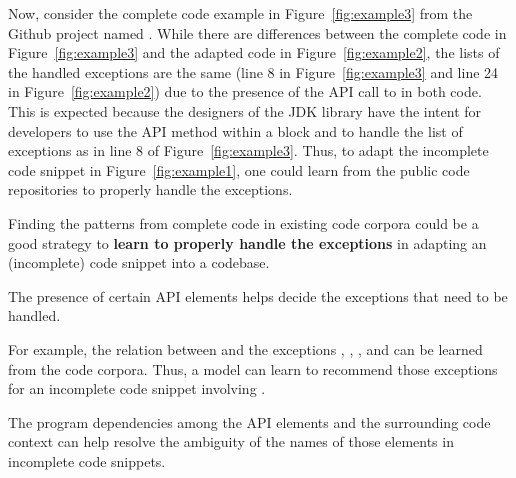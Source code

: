 




Now, consider the complete code example in Figure~\ref{fig:example3}
from the Github project named . While there are
differences between the complete code in Figure~\ref{fig:example3} and
the adapted code in Figure~\ref{fig:example2}, the lists of the handled
exceptions are the same (line 8 in Figure~\ref{fig:example3} and line
24 in Figure~\ref{fig:example2}) due to the presence of the API call
to  in both code. This is expected because
the designers of the JDK library have the intent for developers to use
the API method  within a 
block and to handle the list of exceptions as in line 8 of
Figure~\ref{fig:example3}. Thus, to adapt the incomplete code snippet
in Figure~\ref{fig:example1}, one could learn from the public code
repositories to properly handle the exceptions.

\begin{Observation} 
\label{ob2}
Finding the patterns from complete code in existing code corpora could
be a good strategy to {\bf learn to properly handle the exceptions} in
adapting an (incomplete) code snippet into a codebase.
\end{Observation}

\begin{Observation} 
\label{ob3}
The presence of certain API elements helps decide the exceptions that
need to be handled.
\end{Observation}


For example, the relation between
 and the exceptions
, ,
, and
 can be learned from the
code corpora. Thus, a model can learn to recommend those exceptions
for an incomplete code snippet involving .

\begin{Observation} 
\label{ob4}
The program dependencies among the API elements and the surrounding
code context can help resolve the ambiguity of the names of those
elements in incomplete code snippets.
\end{Observation}

